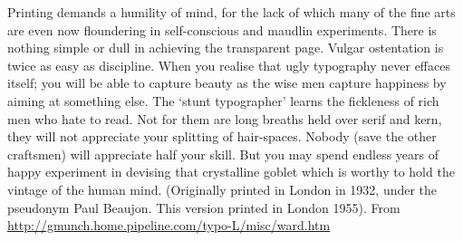 \documentclass[12pt]{article}
\begin{document}
Printing demands a humility of mind, for the lack of which many of the fine arts are even now floundering in self-conscious and maudlin experiments. There is nothing simple or dull in achieving the transparent page. Vulgar ostentation is twice as easy as discipline. When you realise that ugly typography never effaces itself; you will be able to capture beauty as the wise men capture happiness by aiming at something else. The `stunt typographer' learns the fickleness of rich men who hate to read. Not for them are long breaths held over serif and kern, they will not appreciate your splitting of hair-spaces. Nobody (save the other craftsmen) will appreciate half your skill. But you may spend endless years of happy experiment in devising that crystalline goblet which is worthy to hold the vintage of the human mind. (Originally printed in London in 1932, under the pseudonym Paul Beaujon. This version printed in London 1955).
From {\url{http://gmunch.home.pipeline.com/typo-L/misc/ward.htm}}
\end{document}
